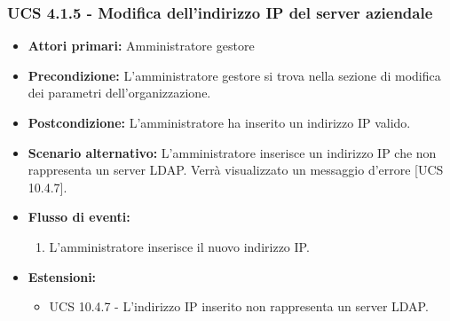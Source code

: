 \subsubsection{UCS 4.1.5 - Modifica dell'indirizzo IP del server aziendale}
\begin{itemize}
\item \textbf{Attori primari:} Amministratore gestore
\item \textbf{Precondizione:} L'amministratore gestore si trova nella sezione di modifica dei parametri dell'organizzazione.
\item \textbf{Postcondizione:} L'amministratore ha inserito un indirizzo IP valido.
\item \textbf{Scenario alternativo:} L'amministratore inserisce un indirizzo IP che non rappresenta un server LDAP. Verrà visualizzato un messaggio d'errore [UCS 10.4.7].
\item \textbf{Flusso di eventi:}
\begin{enumerate}
    \item L'amministratore inserisce il nuovo indirizzo IP.
\end{enumerate}
\item \textbf{Estensioni:}
\begin{itemize}
    \item UCS 10.4.7 - L'indirizzo IP inserito non rappresenta un server LDAP.
\end{itemize}
\end{itemize}



